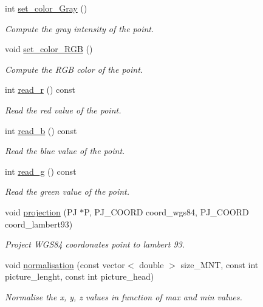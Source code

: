\begin{DoxyCompactItemize}
\mbox{\label{classPoint_abfbc9926badce23e1430415b4771bdce}} 
int \hyperlink{classPoint_abfbc9926badce23e1430415b4771bdce}{set\+\_\+color\+\_\+\+Gray} ()
\begin{DoxyCompactList}\small\item\em Compute the gray intensity of the point. \end{DoxyCompactList}\item 
\mbox{\label{classPoint_a234c768ae41469b0dc500416e3e6312c}} 
void \hyperlink{classPoint_a234c768ae41469b0dc500416e3e6312c}{set\+\_\+color\+\_\+\+R\+GB} ()
\begin{DoxyCompactList}\small\item\em Compute the R\+GB color of the point. \end{DoxyCompactList}\item 
\mbox{\label{classPoint_afe57b9b50ee0490dd522797e2965ed06}} 
int \hyperlink{classPoint_afe57b9b50ee0490dd522797e2965ed06}{read\+\_\+r} () const
\begin{DoxyCompactList}\small\item\em Read the red value of the point. \end{DoxyCompactList}\item 
\mbox{\label{classPoint_a9c7d72820c2cc8592ebb1a3acdef4806}} 
int \hyperlink{classPoint_a9c7d72820c2cc8592ebb1a3acdef4806}{read\+\_\+b} () const
\begin{DoxyCompactList}\small\item\em Read the blue value of the point. \end{DoxyCompactList}\item 
\mbox{\label{classPoint_a003218e4b5a6b409623358c90de8caa7}} 
int \hyperlink{classPoint_a003218e4b5a6b409623358c90de8caa7}{read\+\_\+g} () const
\begin{DoxyCompactList}\small\item\em Read the green value of the point. \end{DoxyCompactList}\item 
void \hyperlink{classPoint_ab1e76e2e6a3e4b70e9909620806a1ace}{projection} (PJ $\ast$P, P\+J\+\_\+\+C\+O\+O\+RD coord\+\_\+wgs84, P\+J\+\_\+\+C\+O\+O\+RD coord\+\_\+lambert93)
\begin{DoxyCompactList}\small\item\em Project W\+G\+S84 coordonate\textquotesingle{}s point to lambert 93. \end{DoxyCompactList}\item 
void \hyperlink{classPoint_a8726641b70376c3700b0b23f0bfff0ae}{normalisation} (const vector$<$ double $>$ size\+\_\+\+M\+NT, const int picture\+\_\+lenght, const int picture\+\_\+head)
\begin{DoxyCompactList}\small\item\em Normalise the x, y, z values in function of max and min values. \end{DoxyCompactList}\end{DoxyCompactItemize}
